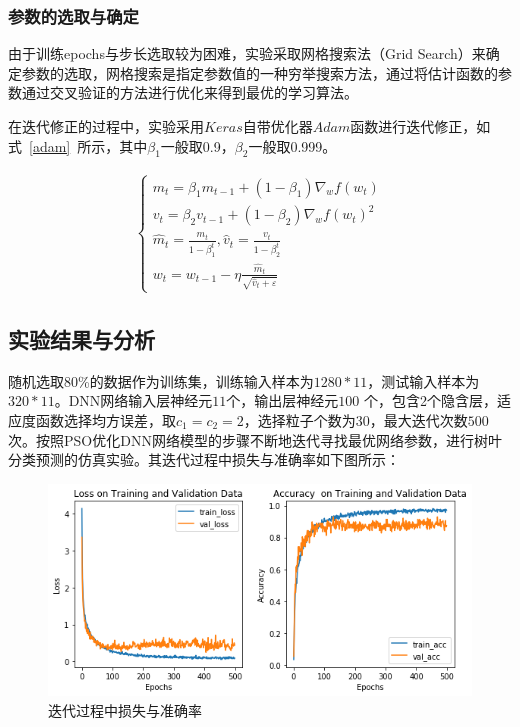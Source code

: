 \documentclass{whutmod}
\begin{document}
	\subsubsection{参数的选取与确定}
	由于训练epochs与步长选取较为困难，实验采取网格搜索法（Grid Search）来确定参数的选取，网格搜索是指定参数值的一种穷举搜索方法，通过将估计函数的参数通过交叉验证的方法进行优化来得到最优的学习算法。
	
	在迭代修正的过程中，实验采用$Keras$自带优化器$Adam$函数进行迭代修正，如式~\ref{adam}~所示，其中$\beta_{1}$一般取0.9，$\beta_{2}$一般取0.999。
	
	\begin{gather}\label{adam}
	\left\{\begin{array}{l}{m_{t}=\beta_{1} m_{t-1}+\left(1-\beta_{1}\right) \nabla_{w} f\left(w_{t}\right)} \\ {v_{t}=\beta_{2} v_{t-1}+\left(1-\beta_{2}\right) \nabla_{w} f\left(w_{t}\right)^{2}} \\ {\widehat{m}_{t}=\frac{m_{t}}{1-\beta_{1}^{t}}, \hat{v}_{t}=\frac{v_{t}}{1-\beta_{2}^{t}}} \\ {w_{t}=w_{t-1}-\eta \frac{\widehat{m}_{t}}{\sqrt{\hat{v}_{t}+\varepsilon}}}\end{array}\right.
	\end{gather}


	\subsection{实验结果与分析}
	随机选取80\%的数据作为训练集，训练输入样本为$1280*11$，测试输入样本为$320*11$。DNN网络输入层神经元$11$个，输出层神经元$100$ 个，包含2个隐含层，适应度函数选择均方误差，取$c_{1}=c_{2}=2$，选择粒子个数为$30$，最大迭代次数$500$次。按照PSO优化DNN网络模型的步骤不断地迭代寻找最优网络参数，进行树叶分类预测的仿真实验。其迭代过程中损失与准确率如下图所示：
			\begin{figure}[H]
		\centering
		\includegraphics[width=\textwidth]{figures/x.png}
		\caption{迭代过程中损失与准确率}\label{xxx}
	\end{figure}
	
\end{document}
